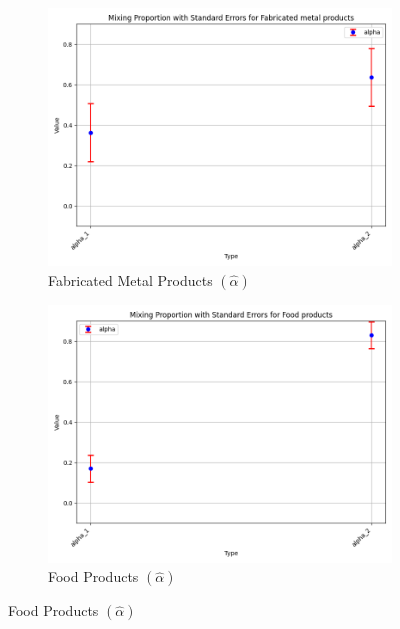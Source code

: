 \documentclass{article}
\begin{document}
\begin{figure}[ht!]
    \centering 
    \caption{I.I.D 3-Component Mixture Model}
    \begin{subfigure}[t]{0.32\textwidth}
        \centering
        \includegraphics[width=\textwidth]{figure/empirical_stat_mixture_alpha_with_error_bars_Fabricated metal products.png}
        \caption{Fabricated Metal Products $(\hat\alpha)$}
    \end{subfigure}
    \begin{subfigure}[t]{0.32\textwidth}
        \centering
        \includegraphics[width=\textwidth]{figure/empirical_stat_mixture_alpha_with_error_bars_Food products.png}
        \caption{Food Products  $(\hat\alpha)$}

\end{subfigure}
\end{figure}
\end{document}
